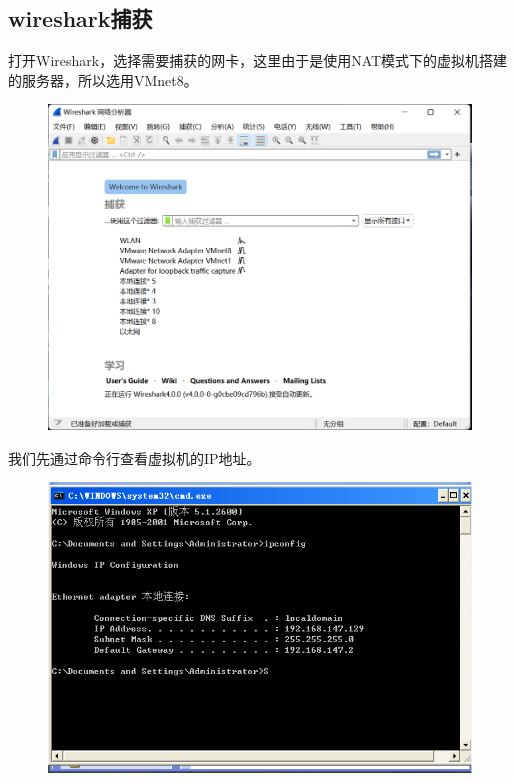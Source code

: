 \documentclass[UTF8,a4paper,10pt]{ctexart}
\begin{document}
\subsection{wireshark捕获}
打开Wireshark，选择需要捕获的网卡，这里由于是使用NAT模式下的虚拟机搭建的服务器，所以选用VMnet8。
\begin{figure}[H]
    \centering
    \includegraphics[scale=0.5]{2.png}
    \label{fig:2}
\end{figure}
我们先通过命令行查看虚拟机的IP地址。
\begin{figure}[H]
    \centering
    \includegraphics[scale=0.6]{3.png}
    \label{fig:3}
\end{figure}
\end{document}
